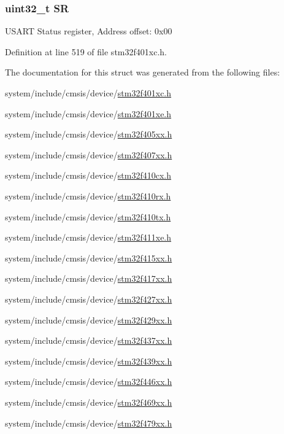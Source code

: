 \subsubsection[{\texorpdfstring{SR}{SR}}]{ uint32\+\_\+t SR}\hypertarget{struct_u_s_a_r_t___type_def_af6aca2bbd40c0fb6df7c3aebe224a360}{}\label{struct_u_s_a_r_t___type_def_af6aca2bbd40c0fb6df7c3aebe224a360}
U\+S\+A\+RT Status register, Address offset\+: 0x00 

Definition at line 519 of file stm32f401xc.\+h.



The documentation for this struct was generated from the following files\+:\begin{DoxyCompactItemize}
\item 
system/include/cmsis/device/\hyperlink{stm32f401xc_8h}{stm32f401xc.\+h}\item 
system/include/cmsis/device/\hyperlink{stm32f401xe_8h}{stm32f401xe.\+h}\item 
system/include/cmsis/device/\hyperlink{stm32f405xx_8h}{stm32f405xx.\+h}\item 
system/include/cmsis/device/\hyperlink{stm32f407xx_8h}{stm32f407xx.\+h}\item 
system/include/cmsis/device/\hyperlink{stm32f410cx_8h}{stm32f410cx.\+h}\item 
system/include/cmsis/device/\hyperlink{stm32f410rx_8h}{stm32f410rx.\+h}\item 
system/include/cmsis/device/\hyperlink{stm32f410tx_8h}{stm32f410tx.\+h}\item 
system/include/cmsis/device/\hyperlink{stm32f411xe_8h}{stm32f411xe.\+h}\item 
system/include/cmsis/device/\hyperlink{stm32f415xx_8h}{stm32f415xx.\+h}\item 
system/include/cmsis/device/\hyperlink{stm32f417xx_8h}{stm32f417xx.\+h}\item 
system/include/cmsis/device/\hyperlink{stm32f427xx_8h}{stm32f427xx.\+h}\item 
system/include/cmsis/device/\hyperlink{stm32f429xx_8h}{stm32f429xx.\+h}\item 
system/include/cmsis/device/\hyperlink{stm32f437xx_8h}{stm32f437xx.\+h}\item 
system/include/cmsis/device/\hyperlink{stm32f439xx_8h}{stm32f439xx.\+h}\item 
system/include/cmsis/device/\hyperlink{stm32f446xx_8h}{stm32f446xx.\+h}\item 
system/include/cmsis/device/\hyperlink{stm32f469xx_8h}{stm32f469xx.\+h}\item 
system/include/cmsis/device/\hyperlink{stm32f479xx_8h}{stm32f479xx.\+h}\end{DoxyCompactItemize}
